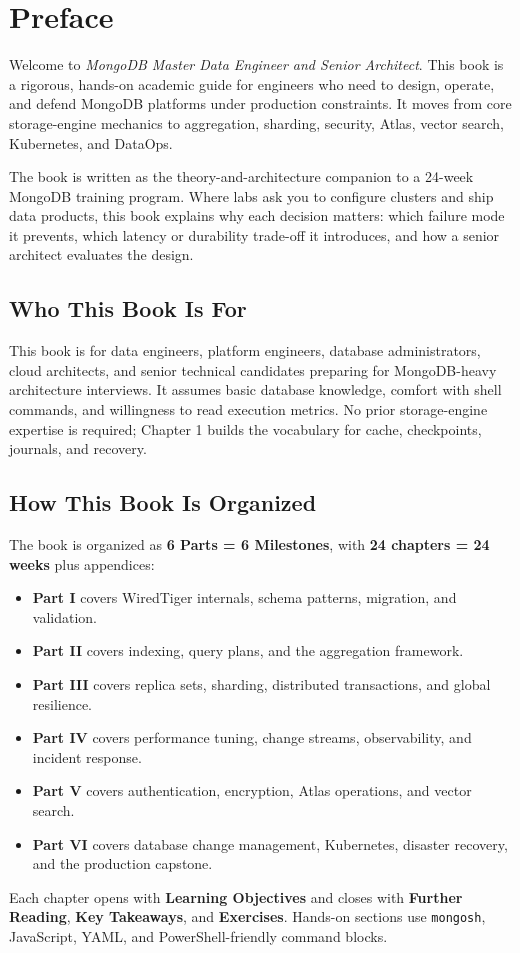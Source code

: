 \chapter*{Preface}
Welcome to \textit{MongoDB Master Data Engineer and Senior Architect}. This book is a rigorous, hands-on academic guide for engineers who need to design, operate, and defend MongoDB platforms under production constraints. It moves from core storage-engine mechanics to aggregation, sharding, security, Atlas, vector search, Kubernetes, and DataOps.

The book is written as the theory-and-architecture companion to a 24-week MongoDB training program. Where labs ask you to configure clusters and ship data products, this book explains why each decision matters: which failure mode it prevents, which latency or durability trade-off it introduces, and how a senior architect evaluates the design.

\section*{Who This Book Is For}
This book is for data engineers, platform engineers, database administrators, cloud architects, and senior technical candidates preparing for MongoDB-heavy architecture interviews. It assumes basic database knowledge, comfort with shell commands, and willingness to read execution metrics. No prior storage-engine expertise is required; Chapter 1 builds the vocabulary for cache, checkpoints, journals, and recovery.

\section*{How This Book Is Organized}
The book is organized as \textbf{6 Parts = 6 Milestones}, with \textbf{24 chapters = 24 weeks} plus appendices:
\begin{itemize}
    \item \textbf{Part I} covers WiredTiger internals, schema patterns, migration, and validation.
    \item \textbf{Part II} covers indexing, query plans, and the aggregation framework.
    \item \textbf{Part III} covers replica sets, sharding, distributed transactions, and global resilience.
    \item \textbf{Part IV} covers performance tuning, change streams, observability, and incident response.
    \item \textbf{Part V} covers authentication, encryption, Atlas operations, and vector search.
    \item \textbf{Part VI} covers database change management, Kubernetes, disaster recovery, and the production capstone.
\end{itemize}
Each chapter opens with \textbf{Learning Objectives} and closes with \textbf{Further Reading}, \textbf{Key Takeaways}, and \textbf{Exercises}. Hands-on sections use \texttt{mongosh}, JavaScript, YAML, and PowerShell-friendly command blocks.

